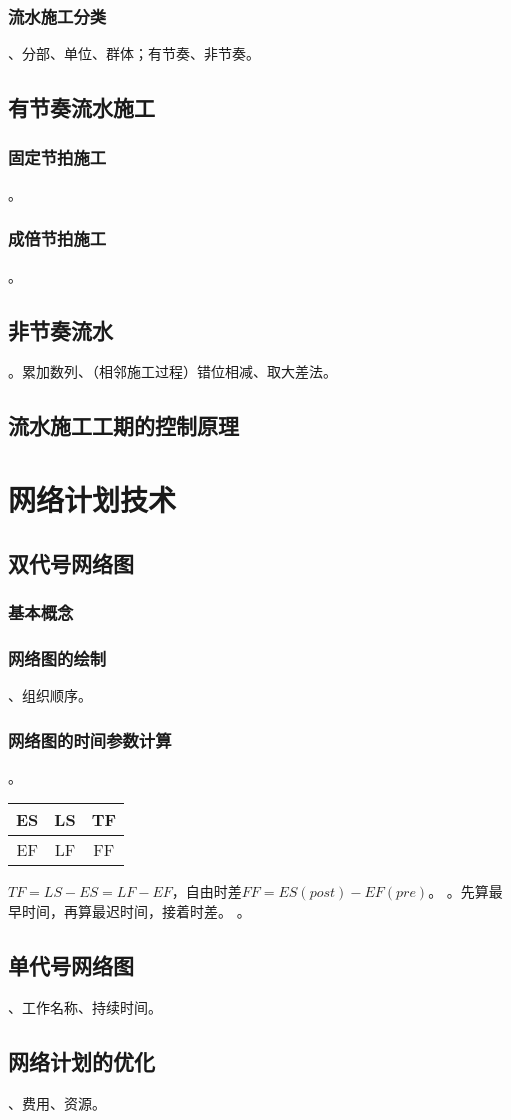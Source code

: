 \documentclass{book}
\begin{document}
\subsection{流水施工分类}
、分部、单位、群体；有节奏、非节奏。
\section{有节奏流水施工}
\subsection{固定节拍施工}
。
\subsection{成倍节拍施工}
。
\section{非节奏流水}
。累加数列、（相邻施工过程）错位相减、取大差法。
\section{流水施工工期的控制原理}
\chapter{网络计划技术}
\section{双代号网络图}
\subsection{基本概念}
\subsection{网络图的绘制}
、组织顺序。
\subsection{网络图的时间参数计算}
。
\begin{table}
    \begin{center}
        \begin{tabular}{c|c|c}
            ES & LS & TF \\
            \hline
            EF & LF & FF
        \end{tabular}
    \end{center}
\end{table}
$TF=LS-ES=LF-EF$，自由时差$FF=ES(post)-EF(pre)$。
。先算最早时间，再算最迟时间，接着时差。
。
\section{单代号网络图}
、工作名称、持续时间。
\section{网络计划的优化}
、费用、资源。
\end{document}
